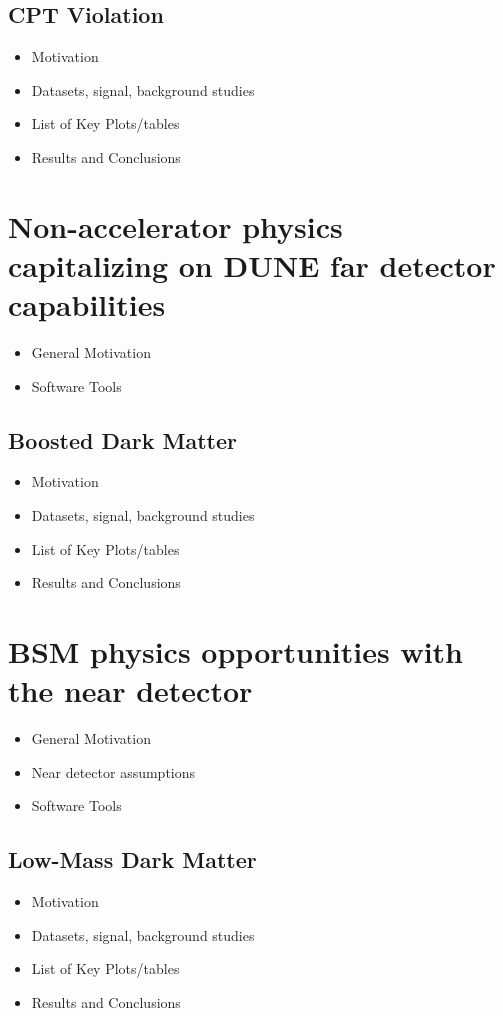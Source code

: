 \subsection{CPT Violation}
\begin{itemize}
\item Motivation
\item Datasets, signal, background studies
\item List of Key Plots/tables
\item Results and Conclusions
\end{itemize}






\section{Non-accelerator physics capitalizing on DUNE far detector capabilities}\label{sec:bsm-nonaccel}
\begin{itemize}
\item General Motivation
\item Software Tools
\end{itemize}

\subsection{Boosted Dark Matter}
\begin{itemize}
\item Motivation
\item Datasets, signal, background studies
\item List of Key Plots/tables
\item Results and Conclusions
\end{itemize}

\section{BSM physics opportunities with the near detector}\label{sec:bsm-nd}
\begin{itemize}
\item General Motivation
\item Near detector assumptions
\item Software Tools
\end{itemize}

\subsection{Low-Mass Dark Matter}
\begin{itemize}
\item Motivation
\item Datasets, signal, background studies
\item List of Key Plots/tables
\item Results and Conclusions
\end{itemize}

